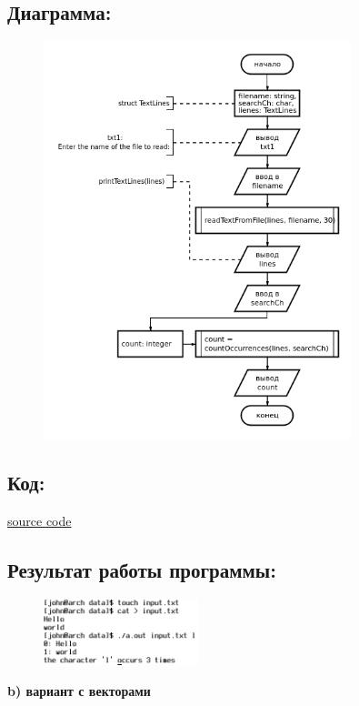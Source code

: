 \documentclass[14pt,a4paper]{article}
\begin{document}
\subsection{Диаграмма:}
\begin{figure}[H]
  \centering
  \includegraphics[width=0.8\textwidth]{data/diagram18_3a.png}
\end{figure}
\subsection{Код:}

\href{https://raw.githubusercontent.com/John1400800/stuff/refs/heads/main/c_learning/home_works/task18_3a.c}{source code}
\subsection{Результат работы программы:}
\begin{figure}[H]
  \includegraphics[width=0.4\textwidth]{data/demo18_3a.png}
\end{figure}
\newpage
{\large\textbf{b) вариант с векторами}}
\setcounter{subsection}{0}
\end{document}
